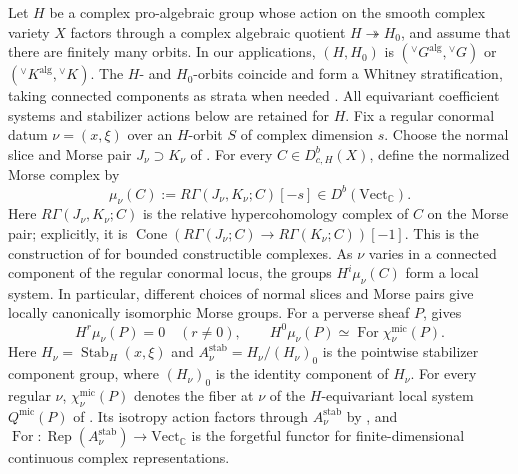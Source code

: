 \documentclass[10pt]{amsart}
\numberwithin{equation}{section}
\theoremstyle{plain}
\theoremstyle{definition}
\theoremstyle{remark}
\DeclareMathOperator{\Rep}{Rep}
\DeclareMathOperator{\For}{For}
\newcommand{\CC}{\mathbb C}
\newcommand{\vG}{{}^{\vee}G}
\newcommand{\vK}{{}^{\vee}K}
\newcommand{\alg}{\mathrm{alg}}
\newcommand{\mic}{\mathrm{mic}}
\begin{document}
Let $H$ be a complex pro-algebraic group whose action on the smooth
complex variety $X$ factors through a complex algebraic quotient
$H\twoheadrightarrow H_0$, and assume that there are finitely many
orbits. In our applications, $(H,H_0)$ is
$(\vG^{\alg},\vG)$ or $(\vK^{\alg},\vK)$.
The $H$- and $H_0$-orbits coincide and form a Whitney stratification,
taking connected components as strata when needed
\cite[Section~2.3, p.~3582]{FR18}.
All equivariant coefficient systems and stabilizer actions below
are retained for $H$.
Fix a regular conormal datum $\nu=(x,\xi)$ over an $H$-orbit $S$ of
complex dimension $s$. Choose the normal slice and Morse pair
$J_\nu\supset K_\nu$ of \cite[(24.10)(a)]{ABV92}. For every
$C\in D^b_{c,H}(X)$, define the normalized Morse complex by
\begin{equation}\label{eq:normal-morse}
 \mu_\nu(C):=R\Gamma(J_\nu,K_\nu;C)[-s]\in D^b(\mathrm{Vect}_{\CC}).
\end{equation}
Here $R\Gamma(J_\nu,K_\nu;C)$ is the relative hypercohomology complex
of $C$ on the Morse pair; explicitly, it is
$\operatorname{Cone}(R\Gamma(J_\nu;C)\to R\Gamma(K_\nu;C))[-1]$.
This is the construction of \cite[Definition~24.11]{ABV92} for bounded
constructible complexes. As $\nu$ varies in a connected component of the
regular conormal locus, the groups $H^i\mu_\nu(C)$ form a local system. In
particular, different choices of normal slices and Morse pairs give locally
canonically isomorphic Morse groups. For a perverse sheaf $P$,
\cite[(24.10)(b),(c) and
Theorem~24.8(c)]{ABV92} gives
\begin{equation}\label{eq:morse-perverse}
 H^r\mu_\nu(P)=0\quad(r\neq0),
 \qquad
 H^0\mu_\nu(P)\simeq\For\chi_\nu^{\mic}(P).
\end{equation}
Here $H_\nu=\operatorname{Stab}_H(x,\xi)$ and
$A_\nu^{\mathrm{stab}}=H_\nu/(H_\nu)_0$ is the pointwise stabilizer
component group, where $(H_\nu)_0$ is the identity component of $H_\nu$. For every
regular $\nu$, $\chi_\nu^{\mic}(P)$ denotes the fiber at $\nu$ of the
$H$-equivariant local system $Q^{\mic}(P)$ of
\cite[Theorem~24.8]{ABV92}. Its isotropy action factors through
$A_\nu^{\mathrm{stab}}$ by \cite[Lemma~7.3(d)]{ABV92}, and
$\For:\Rep(A_\nu^{\mathrm{stab}})\to\mathrm{Vect}_{\CC}$ is the
forgetful functor for finite-dimensional continuous complex
representations.
\end{document}
